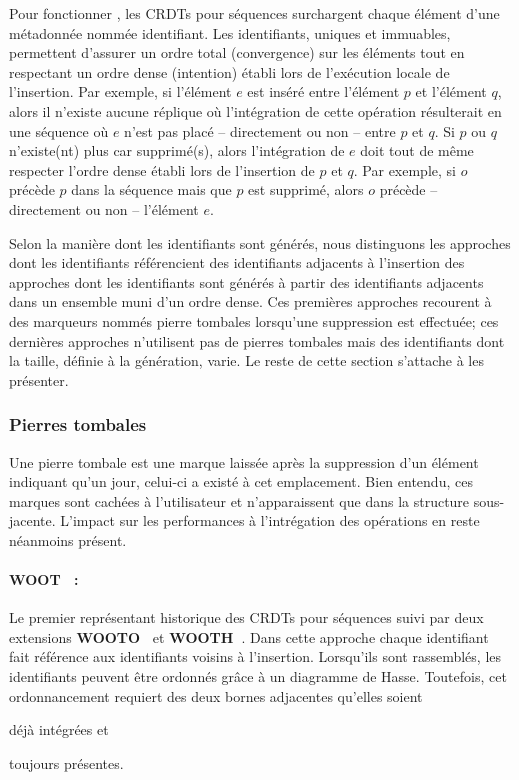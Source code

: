Pour fonctionner , les CRDTs pour séquences surchargent chaque élément d'une
métadonnée nommée identifiant. Les identifiants, uniques et immuables,
permettent d'assurer un ordre total (convergence) sur les éléments tout en
respectant un ordre dense (intention) établi lors de l'exécution locale de
l'insertion. Par exemple, si l'élément $e$ est inséré entre l'élément $p$ et
l'élément $q$, alors il n'existe aucune réplique où l'intégration de cette
opération résulterait en une séquence où $e$ n'est pas placé -- directement ou
non -- entre $p$ et $q$.  Si $p$ ou $q$ n'existe(nt) plus car supprimé(s), alors
l'intégration de $e$ doit tout de même respecter l'ordre dense établi lors de
l'insertion de $p$ et $q$. Par exemple, si $o$ précède $p$ dans la séquence mais
que $p$ est supprimé, alors $o$ précède -- directement ou non -- l'élément $e$.

Selon la manière dont les identifiants sont générés, nous distinguons les
approches dont les identifiants référencient des identifiants adjacents à
l'insertion des approches dont les identifiants sont générés à partir des
identifiants adjacents dans un ensemble muni d'un ordre dense. Ces premières
approches recourent à des marqueurs nommés \og pierre tombales \fg lorsqu'une
suppression est effectuée; ces dernières approches n'utilisent pas de pierres
tombales mais des identifiants dont la taille, définie à la génération, varie.
Le reste de cette section s'attache à les présenter.

\subsubsection{Pierres tombales}

Une pierre tombale est une marque laissée après la suppression d'un élément
indiquant qu'un jour, celui-ci a existé à cet emplacement. Bien entendu, ces
marques sont cachées à l'utilisateur et n'apparaissent que dans la structure
sous-jacente. L'impact sur les performances à l'intrégation des opérations en
reste néanmoins présent.

\paragraph{WOOT~\cite{oster2006data} :} Le premier représentant historique des
CRDTs pour séquences suivi par deux extensions
\textbf{WOOTO~\cite{weiss2007wooki}} et
\textbf{WOOTH~\cite{ahmed2011evaluating}}. Dans cette approche chaque
identifiant fait référence aux identifiants voisins à l'insertion.  Lorsqu'ils
sont rassemblés, les identifiants peuvent être ordonnés grâce à un diagramme de
Hasse. Toutefois, cet ordonnancement requiert des deux bornes adjacentes
qu'elles soient
\begin{inparaenum}[(i)]
\item déjà intégrées et
\item toujours présentes.
\end{inparaenum}

